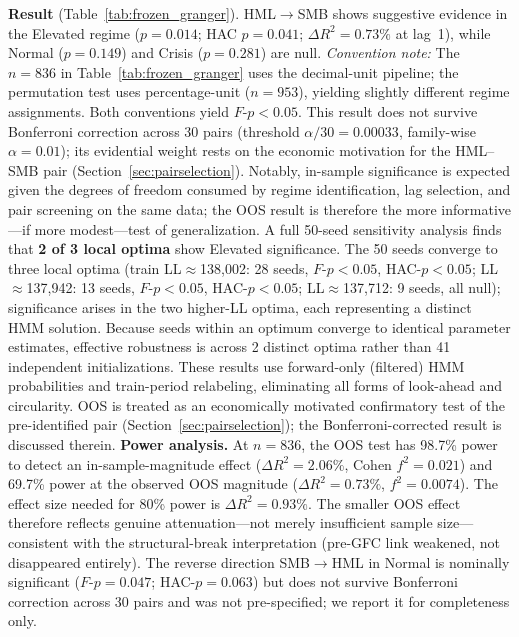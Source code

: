 \documentclass[sigconf,anonymous]{acmart}
\begin{document}
\textbf{Result} (Table~\ref{tab:frozen_granger}). HML$\to$SMB shows suggestive evidence in the Elevated regime
($p = 0.014$; HAC $p = 0.041$; $\Delta R^2 = 0.73\%$ at lag~1),
while Normal ($p = 0.149$) and Crisis ($p = 0.281$) are null.
\emph{Convention note:} The $n = 836$ in Table~\ref{tab:frozen_granger} uses the
decimal-unit pipeline; the permutation test uses percentage-unit ($n = 953$), yielding
slightly different regime assignments. Both conventions yield $F$-$p < 0.05$.
This result does not survive Bonferroni correction across 30 pairs
(threshold $\alpha/30 = 0.00033$, family-wise $\alpha = 0.01$); its evidential weight
rests on the economic motivation for the HML--SMB pair
(Section~\ref{sec:pairselection}).
Notably, in-sample significance is expected given the degrees of freedom consumed
by regime identification, lag selection, and pair screening on the same data;
the OOS result is therefore the more informative---if more modest---test of
generalization.
A full 50-seed sensitivity
analysis finds that \textbf{2 of 3 local optima} show Elevated significance.
The 50 seeds converge to three local optima (train LL$\approx$138,002: 28 seeds,
$F$-$p < 0.05$, HAC-$p < 0.05$; LL$\approx$137,942: 13 seeds,
$F$-$p < 0.05$, HAC-$p < 0.05$; LL$\approx$137,712: 9 seeds, all null);
significance arises in the two higher-LL optima, each representing a distinct
HMM solution. Because seeds within an optimum converge to identical parameter estimates,
effective robustness is across 2 distinct optima rather than 41 independent initializations.
These results use forward-only (filtered)
HMM probabilities and train-period relabeling, eliminating all forms
of look-ahead and circularity.
OOS is treated as an economically motivated confirmatory test of the pre-identified pair
(Section~\ref{sec:pairselection}); the Bonferroni-corrected result is discussed therein.
\textbf{Power analysis.} At $n = 836$, the OOS test has 98.7\% power to detect an
in-sample-magnitude effect ($\Delta R^2 = 2.06\%$, Cohen $f^2 = 0.021$) and 69.7\%
power at the observed OOS magnitude ($\Delta R^2 = 0.73\%$, $f^2 = 0.0074$). The
effect size needed for 80\% power is $\Delta R^2 = 0.93\%$. The smaller OOS effect
therefore reflects genuine attenuation---not merely insufficient sample size---consistent
with the structural-break interpretation (pre-GFC link weakened, not disappeared entirely).
The reverse direction SMB$\to$HML in Normal is nominally significant ($F$-$p = 0.047$;
HAC-$p = 0.063$) but does not survive Bonferroni correction across 30 pairs and was
not pre-specified; we report it for completeness only.
\end{document}
